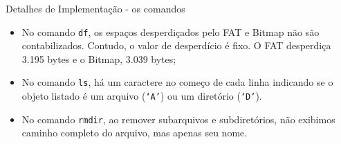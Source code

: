 \documentclass[10pt]{beamer}
\begin{document}
    \begin{frame}{Detalhes de Implementação - os comandos}
        \begin{itemize}
            \justifying
            \item No comando \texttt{df}, os espaços desperdiçados pelo FAT e
                Bitmap não são contabilizados. Contudo, o valor de desperdício é
                fixo. O FAT desperdiça 3.195 bytes e o Bitmap, 3.039 bytes;
            \item No comando \texttt{ls}, há um caractere no começo de cada
                linha indicando se o objeto listado é um arquivo (\texttt{`A'})
                ou um diretório (\texttt{`D'}).
            \item No comando \texttt{rmdir}, ao remover subarquivos e
                subdiretórios, não exibimos caminho completo do arquivo, mas
                apenas seu nome.
        \end{itemize}
    \end{frame}
\end{document}
